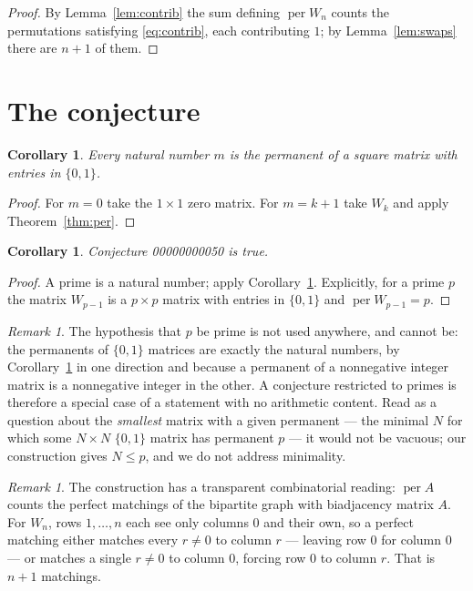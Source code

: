 \documentclass[11pt]{article}
\theoremstyle{plain}
\newtheorem{corollary}[theorem]{Corollary}
\theoremstyle{definition}
\theoremstyle{remark}
\newtheorem{remark}[theorem]{Remark}
\DeclareMathOperator{\per}{per}
\begin{document}
\begin{proof}
By Lemma~\ref{lem:contrib} the sum defining $\per W_n$ counts the permutations
satisfying \eqref{eq:contrib}, each contributing $1$; by Lemma~\ref{lem:swaps}
there are $n+1$ of them.
\end{proof}

\section{The conjecture}

\begin{corollary}\label{cor:all}
Every natural number $m$ is the permanent of a square matrix with entries in
$\{0,1\}$.
\end{corollary}

\begin{proof}
For $m=0$ take the $1\times1$ zero matrix. For $m=k+1$ take $W_k$ and apply
Theorem~\ref{thm:per}.
\end{proof}

\begin{corollary}
Conjecture 00000000050 is true.
\end{corollary}

\begin{proof}
A prime is a natural number; apply Corollary~\ref{cor:all}. Explicitly, for a
prime $p$ the matrix $W_{p-1}$ is a $p\times p$ matrix with entries in
$\{0,1\}$ and $\per W_{p-1}=p$.
\end{proof}

\begin{remark}
The hypothesis that $p$ be prime is not used anywhere, and cannot be: the
permanents of $\{0,1\}$ matrices are exactly the natural numbers, by
Corollary~\ref{cor:all} in one direction and because a permanent of a
nonnegative integer matrix is a nonnegative integer in the other. A
conjecture restricted to primes is therefore a special case of a statement with
no arithmetic content. Read as a question about the \emph{smallest} matrix with
a given permanent --- the minimal $N$ for which some $N\times N$ $\{0,1\}$
matrix has permanent $p$ --- it would not be vacuous; our construction gives
$N\le p$, and we do not address minimality.
\end{remark}

\begin{remark}
The construction has a transparent combinatorial reading: $\per A$ counts the
perfect matchings of the bipartite graph with biadjacency matrix $A$. For
$W_n$, rows $1,\ldots,n$ each see only columns $0$ and their own, so a perfect
matching either matches every $r\ne0$ to column $r$ --- leaving row $0$ for
column $0$ --- or matches a single $r\ne0$ to column $0$, forcing row $0$ to
column $r$. That is $n+1$ matchings.
\end{remark}
\end{document}
